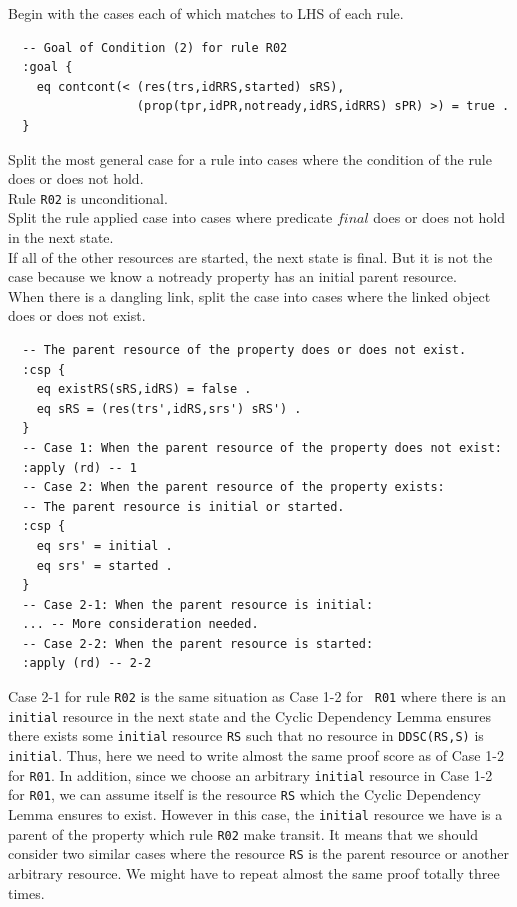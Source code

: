 \documentclass[12pt]{report}
\newcommand{\stt}[1]{{\small{\tt {#1}}}}
\begin{document}
 Begin with the cases each of which matches to
LHS of each rule.
\begin{verbatim}
  -- Goal of Condition (2) for rule R02
  :goal {
    eq contcont(< (res(trs,idRRS,started) sRS),
                  (prop(tpr,idPR,notready,idRS,idRRS) sPR) >) = true .
  }
\end{verbatim}
 Split the most general case for a rule into
cases where the condition of the rule does or does not hold. \\
Rule {\tt R02} is unconditional.\\
 Split the rule applied case into cases where
predicate $final$ does or does not hold in the next state.\\
If all of the other resources are started, the next state is final.
But it is not the case because we know a notready property has
an initial parent resource. \\
 When there is a
dangling link, split the case into cases where the linked object does
or does not exist. 
\begin{verbatim}
  -- The parent resource of the property does or does not exist.
  :csp {
    eq existRS(sRS,idRS) = false .
    eq sRS = (res(trs',idRS,srs') sRS') .
  }
  -- Case 1: When the parent resource of the property does not exist:
  :apply (rd) -- 1
  -- Case 2: When the parent resource of the property exists:
  -- The parent resource is initial or started.
  :csp {
    eq srs' = initial .
    eq srs' = started .
  }
  -- Case 2-1: When the parent resource is initial:
  ... -- More consideration needed.
  -- Case 2-2: When the parent resource is started:
  :apply (rd) -- 2-2
\end{verbatim}
Case 2-1 for rule {\tt R02} is the same situation as Case 1-2 for {\tt
  R01} where there is an {\tt initial} resource in the next state and
the Cyclic Dependency Lemma ensures there exists some {\tt initial}
resource {\tt RS} such that no resource in \stt{DDSC(RS,S)} is {\tt
  initial}. Thus, here we need to write almost the same proof score as
of Case 1-2 for {\tt R01}. In addition, since we choose an arbitrary
{\tt initial} resource in Case 1-2 for {\tt R01}, we can assume itself
is the resource {\tt RS} which the Cyclic Dependency Lemma ensures to
exist. However in this case, the {\tt initial} resource we have is
a parent of the property which rule {\tt R02} make transit. It means
that we should consider two similar cases where the resource {\tt RS}
is the parent resource or another arbitrary resource. We might have 
to repeat almost the same proof totally three times.
\end{document}
